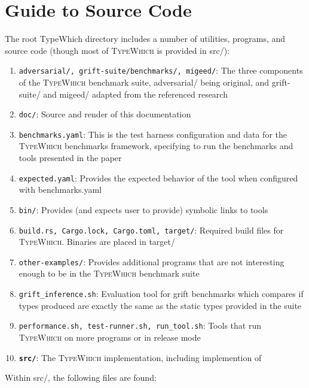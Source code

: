 \documentclass{book}
\newcommand{\system}{\textsc{TypeWhich}\xspace}
\begin{document}
\chapter{Guide to Source Code}

The root TypeWhich directory includes a number of utilities, programs, and
source code (though most of \system is provided in src/):

\begin{enumerate}
    \item \texttt{adversarial/, grift-suite/benchmarks/, migeed/}: The three
    components of the \system benchmark suite, adversarial/ being original, and
    grift-suite/ and migeed/ adapted from the referenced research
    \item \texttt{doc/}: Source and render of this documentation
    \item \texttt{benchmarks.yaml}: This is the test harness configuration and data
    for the \system benchmarks framework, specifying to run the benchmarks and
    tools presented in the paper
    \item \texttt{expected.yaml}: Provides the expected behavior of the tool when
    configured with benchmarks.yaml
    \item \texttt{bin/}: Provides (and expects user to provide) symbolic links to tools
    \item \texttt{build.rs, Cargo.lock, Cargo.toml, target/}: Required build files for
    \system. Binaries are placed in target/
    \item \texttt{other-examples/}: Provides additional programs that are not
    interesting enough to be in the \system benchmark suite
    \item \texttt{grift\_inference.sh}: Evaluation tool for grift benchmarks
    which compares if types produced are exactly the same as the static types
    provided in the suite
    \item \texttt{performance.sh, test-runner.sh, run\_tool.sh}: Tools that run
    \system on more programs or in release mode
    \item \textbf{\texttt{src/}}: The \system implementation, including implemention of
    \citet{rastogi:gti}
\end{enumerate}

Within src/, the following files are found:
\end{document}
